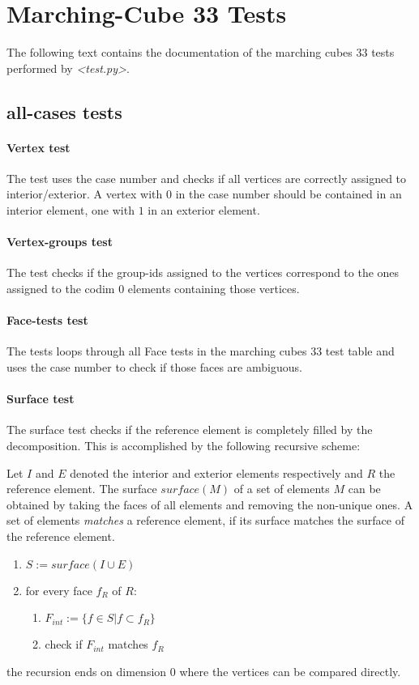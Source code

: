 \documentclass[a4paper, 11pt]{scrartcl}
\newcommand{\file}[1]{\emph{\textless #1\textgreater}}
\begin{document}
\section*{Marching-Cube 33 Tests}
The following text contains the documentation of the marching cubes 33 tests performed by \file{test.py}.
\subsection*{all-cases tests}
\paragraph*{Vertex test}
The test uses the case number and checks if all vertices are correctly assigned to interior/exterior. A vertex with $0$ in the case number should be contained in an interior element, one with $1$ in an exterior element.
\paragraph*{Vertex-groups test}
The test checks if the group-ids assigned to the vertices correspond
to the ones assigned to the codim 0 elements containing those
vertices.
\paragraph*{Face-tests test}
The tests loops through all Face tests in the marching cubes 33 test table and uses the case number to check if those faces are ambiguous.
\paragraph*{Surface test}
The surface test checks if the reference element is completely filled by the decomposition. This is accomplished by the following recursive scheme:

Let $I$ and $E$ denoted the interior and exterior elements respectively and $R$ the reference element. The surface $surface(M)$ of a set of elements $M$ can be obtained by taking the faces of all elements and removing the non-unique ones. A set of elements \emph{matches} a reference element, if its surface matches the surface of the reference element.
\begin{enumerate}
\item $S:=surface(I\cup E)$
\item for every face $f_R$ of $R$:
  \begin{enumerate}
  \item $F_{int}:=\lbrace f \in S | f\subset f_R\rbrace$
  \item check if $F_{int}$ matches $f_R$
  \end{enumerate}
\end{enumerate}
the recursion ends on dimension $0$ where the vertices can be compared directly.
\end{document}

